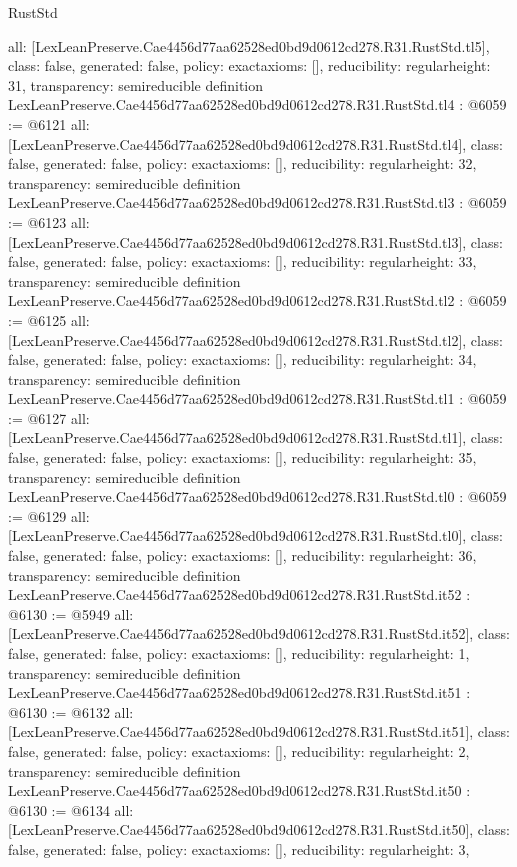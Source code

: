 \begin{lexlean}{RustStd}
\begin{coremodule}
{  all: [LexLeanPreserve.Cae4456d77aa62528ed0bd9d0612cd278.R31.RustStd.tl5],
  class: false,
  generated: false,
  policy: exact{axioms: []},
  reducibility: regular{height: 31},
  transparency: semireducible
}
definition LexLeanPreserve.Cae4456d77aa62528ed0bd9d0612cd278.R31.RustStd.tl4 : @6059 := @6121 {
  all: [LexLeanPreserve.Cae4456d77aa62528ed0bd9d0612cd278.R31.RustStd.tl4],
  class: false,
  generated: false,
  policy: exact{axioms: []},
  reducibility: regular{height: 32},
  transparency: semireducible
}
definition LexLeanPreserve.Cae4456d77aa62528ed0bd9d0612cd278.R31.RustStd.tl3 : @6059 := @6123 {
  all: [LexLeanPreserve.Cae4456d77aa62528ed0bd9d0612cd278.R31.RustStd.tl3],
  class: false,
  generated: false,
  policy: exact{axioms: []},
  reducibility: regular{height: 33},
  transparency: semireducible
}
definition LexLeanPreserve.Cae4456d77aa62528ed0bd9d0612cd278.R31.RustStd.tl2 : @6059 := @6125 {
  all: [LexLeanPreserve.Cae4456d77aa62528ed0bd9d0612cd278.R31.RustStd.tl2],
  class: false,
  generated: false,
  policy: exact{axioms: []},
  reducibility: regular{height: 34},
  transparency: semireducible
}
definition LexLeanPreserve.Cae4456d77aa62528ed0bd9d0612cd278.R31.RustStd.tl1 : @6059 := @6127 {
  all: [LexLeanPreserve.Cae4456d77aa62528ed0bd9d0612cd278.R31.RustStd.tl1],
  class: false,
  generated: false,
  policy: exact{axioms: []},
  reducibility: regular{height: 35},
  transparency: semireducible
}
definition LexLeanPreserve.Cae4456d77aa62528ed0bd9d0612cd278.R31.RustStd.tl0 : @6059 := @6129 {
  all: [LexLeanPreserve.Cae4456d77aa62528ed0bd9d0612cd278.R31.RustStd.tl0],
  class: false,
  generated: false,
  policy: exact{axioms: []},
  reducibility: regular{height: 36},
  transparency: semireducible
}
definition LexLeanPreserve.Cae4456d77aa62528ed0bd9d0612cd278.R31.RustStd.it52 : @6130 := @5949 {
  all: [LexLeanPreserve.Cae4456d77aa62528ed0bd9d0612cd278.R31.RustStd.it52],
  class: false,
  generated: false,
  policy: exact{axioms: []},
  reducibility: regular{height: 1},
  transparency: semireducible
}
definition LexLeanPreserve.Cae4456d77aa62528ed0bd9d0612cd278.R31.RustStd.it51 : @6130 := @6132 {
  all: [LexLeanPreserve.Cae4456d77aa62528ed0bd9d0612cd278.R31.RustStd.it51],
  class: false,
  generated: false,
  policy: exact{axioms: []},
  reducibility: regular{height: 2},
  transparency: semireducible
}
definition LexLeanPreserve.Cae4456d77aa62528ed0bd9d0612cd278.R31.RustStd.it50 : @6130 := @6134 {
  all: [LexLeanPreserve.Cae4456d77aa62528ed0bd9d0612cd278.R31.RustStd.it50],
  class: false,
  generated: false,
  policy: exact{axioms: []},
  reducibility: regular{height: 3},
}
\end{coremodule}
\end{lexlean}
